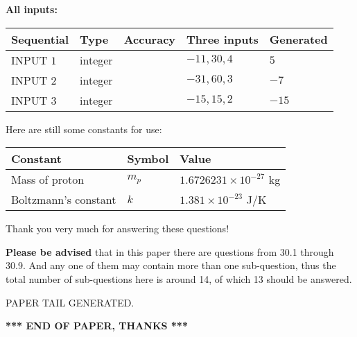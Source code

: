 \documentclass[12pt]{article}
\begin{document}
   
   
   
\noindent\vspace{0.1in}\hspace{-0.08in} {\textbf{\Large{All inputs: }}}
   
   
  
  
\noindent\begin{tabular}{|l|l|l|l|l|}
\hline
 Sequential & Type & Accuracy & Three inputs & Generated \\ 
\hline
 
 
  INPUT $           1$ & integer &  & $
 -11
 , 
 30
 , 
 4
 $ & $ 5 $ 
 \\  \hline  
 
 
  INPUT $           2$ & integer &  & $
 -31
 , 
 60
 , 
 3
 $ & $ -7 $ 
 \\  \hline  
 
 
  INPUT $           3$ & integer &  & $
 -15
 , 
 15
 , 
 2
 $ & $ -15 $ 
 \\  \hline  
 \end{tabular}
   
   
   
   
   
   
 \vspace{0.2in}
Here are still some constants for use:
 
 
\noindent\begin{tabular}{|l|l|l|}
\hline
Constant & Symbol & Value \\
\hline
 
Mass of proton &
$m_p$ &
 $ 1.6726231 \times 10^{-27} $
kg \\
\hline
 
Boltzmann's constant &
$k$ &
 $ 1.381 \times 10^{-23} $
J/K \\
\hline
 
\end{tabular}
 
Thank you very much for answering these questions!
 
{\textbf{\large{Please be advised}}} that in this paper there are questions from
30.1 through
30.9.
And any one of them may contain more than one sub-question, thus the total number
of sub-questions here is around 14, of which
13 should be answered.
 
   
   
\vspace{2.0in} PAPER TAIL GENERATED.
   
   
   
   
\vspace{1.0in} 
{\textbf{\large{ *** END OF PAPER, THANKS *** }}} 
   
\end{document}
